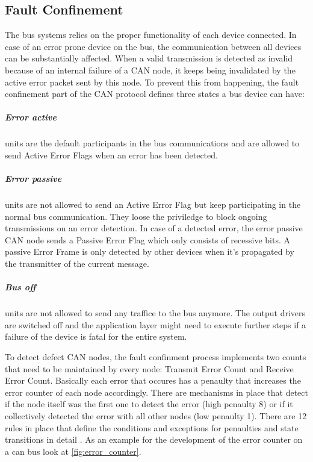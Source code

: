 	\subsection{Fault Confinement}
	The bus systems relies on the proper functionality of each device connected. In
	case of an error prone device on the bus, the communication between all devices
	can be substantially affected. When a valid transmission is detected as
	invalid because of an internal failure of a CAN node, it keeps being
	invalidated by the active error packet sent by this node. To prevent this from
	happening, the fault confinement part of the CAN protocol defines three states
	a bus device can have:
	\subparagraph{Error active} units are the default participants in the bus
	communications and are allowed to send Active Error Flags when an error has
	been detected. 
	\subparagraph{Error passive} units are not allowed to send an Active Error Flag
	but keep participating in the normal bus communication. They loose the
	priviledge to block ongoing transmissions on an error detection. In case of a
	detected error, the error passive CAN node sends a Passive Error Flag which
	only consists of recessive bits. A passive Error Frame is only detected by
	other devices when it's propagated by the transmitter of the current message.
	\subparagraph{Bus off} units are not allowed to send any traffice to the bus
	anymore. The output drivers are switched off and the application layer might
	need to execute further steps if a failure of the device is fatal for the
	entire system.
	
	To detect defect CAN nodes, the fault confinment process implements two counts
	that need to be maintained by every node: Transmit Error Count and Receive
	Error Count. Basically each error that occures has a penaulty that increases
	the error counter of each node accordingly. There are mechanisms in place that
	detect if the node itself was the first one to detect the error (high penaulty
	8) or if it collectively detected the error with all other nodes (low penaulty
	1). There are 12 rules in place that define the conditions and exceptions for
	penaulties and state transitions in detail \cite{can2spec}. As an example for
	the development of the error counter on a can bus look at
	\autoref{fig:error_counter}.
	
